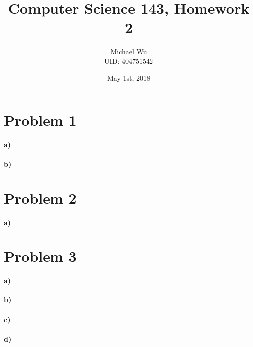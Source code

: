 \documentclass[12pt]{article}
\begin{document}
\title{Computer Science 143, Homework 2}
\date{May 1st, 2018}
\author{Michael Wu\\UID: 404751542}
\maketitle

\section*{Problem 1}

\paragraph{a)}

\paragraph{b)}

\section*{Problem 2}

\paragraph{a)}

\section*{Problem 3}

\paragraph{a)}

\paragraph{b)}

\paragraph{c)}

\paragraph{d)}
\end{document}
